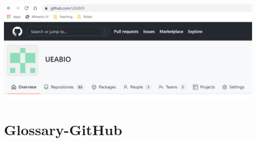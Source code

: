 \documentclass[
]{book}
\begin{document}
\includegraphics[width=18.83in]{images/classroom-organisation}

\hypertarget{glossary-github}{%
\section{Glossary-GitHub}\label{glossary-github}}
\end{document}
